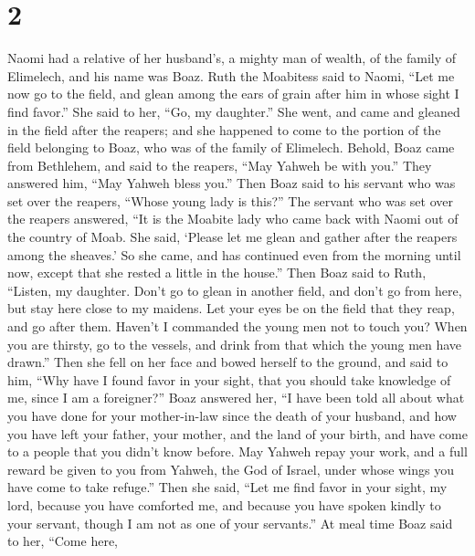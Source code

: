 \hypertarget{section-1}{%
\section{2}\label{section-1}}

 Naomi had a relative of her husband's, a mighty man of
wealth, of the family of Elimelech, and his name was Boaz.
 Ruth the Moabitess said to Naomi, ``Let me now go to the
field, and glean among the ears of grain after him in whose sight I find
favor.'' She said to her, ``Go, my daughter.''  She went,
and came and gleaned in the field after the reapers; and she happened to
come to the portion of the field belonging to Boaz, who was of the
family of Elimelech.  Behold, Boaz came from Bethlehem,
and said to the reapers, ``May Yahweh be with you.'' They answered him,
``May Yahweh bless you.''  Then Boaz said to his servant
who was set over the reapers, ``Whose young lady is this?''
 The servant who was set over the reapers answered, ``It
is the Moabite lady who came back with Naomi out of the country of Moab.
 She said, `Please let me glean and gather after the
reapers among the sheaves.' So she came, and has continued even from the
morning until now, except that she rested a little in the house.''
 Then Boaz said to Ruth, ``Listen, my daughter. Don't go
to glean in another field, and don't go from here, but stay here close
to my maidens.  Let your eyes be on the field that they
reap, and go after them. Haven't I commanded the young men not to touch
you? When you are thirsty, go to the vessels, and drink from that which
the young men have drawn.''  Then she fell on her face
and bowed herself to the ground, and said to him, ``Why have I found
favor in your sight, that you should take knowledge of me, since I am a
foreigner?''  Boaz answered her, ``I have been told all
about what you have done for your mother-in-law since the death of your
husband, and how you have left your father, your mother, and the land of
your birth, and have come to a people that you didn't know before.
 May Yahweh repay your work, and a full reward be given
to you from Yahweh, the God of Israel, under whose wings you have come
to take refuge.''  Then she said, ``Let me find favor in
your sight, my lord, because you have comforted me, and because you have
spoken kindly to your servant, though I am not as one of your
servants.''  At meal time Boaz said to her, ``Come here,
